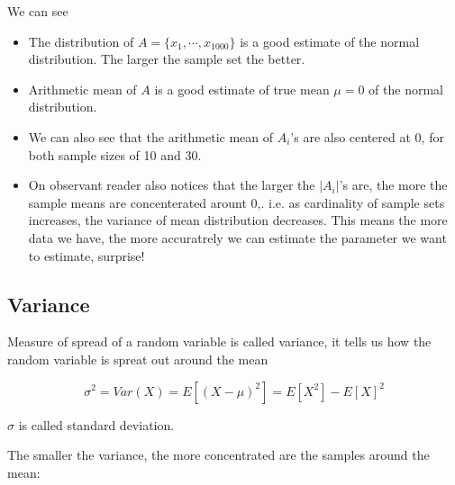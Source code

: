 \documentclass[11pt]{article}
\begin{document}
We can see

\begin{itemize}
\item
  The distribution of $A=\{x_1, \cdots, x_{1000}\}$ is a good estimate
  of the normal distribution. The larger the sample set the better.
\item
  Arithmetic mean of $A$ is a good estimate of true mean $\mu=0$ of
  the normal distribution.
\item
  We can also see that the arithmetic mean of $A_i$'s are also
  centered at 0, for both sample sizes of 10 and 30.
\item
  On observant reader also notices that the larger the $|A_i|$'s are,
  the more the sample means are concenterated arount 0,. i.e. as
  cardinality of sample sets increases, the variance of mean
  distribution decreases. This means the more data we have, the more
  accuratrely we can estimate the parameter we want to estimate,
  surprise!
\end{itemize}

    \subsection{Variance}\label{variance}

    Measure of spread of a random variable is called variance, it tells us
how the random variable is spreat out around the mean

\[\sigma^2 = Var(X) = E[(X-\mu)^2] = E[X^2] - E[X]^2 \tag{3}\]

$\sigma$ is called standard deviation.

The smaller the variance, the more concentrated are the samples around
the mean:
\end{document}
